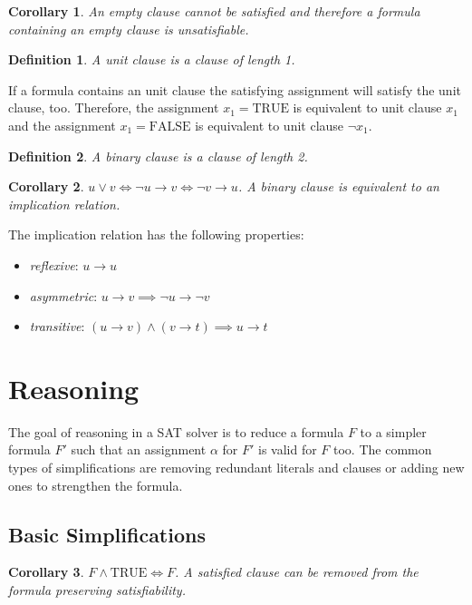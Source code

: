 \documentclass[12pt]{article}
\newtheorem{definition}{Definition}
\newtheorem{corollary}{Corollary}
\newcommand{\T}{\text{TRUE}}
\begin{document}
\begin{corollary}
An \emph{empty clause} cannot be satisfied and therefore a formula containing an empty clause
is unsatisfiable.
\end{corollary}

\begin{definition}
A \emph{unit clause} is a clause of length 1.
\end{definition}
If a formula contains an unit clause the satisfying
assignment will satisfy the unit clause, too. Therefore, the assignment $x_1 = \text{TRUE}$
is equivalent to unit clause $x_1$ and the assignment $x_1 = \text{FALSE}$ is equivalent to
unit clause $\neg x_1$.

\begin{definition}
A \emph{binary clause} is a clause of length 2.
\end{definition}

\begin{corollary}
$u \lor v \iff \neg u \rightarrow v \iff \neg v \rightarrow u$. A binary clause is
equivalent to an implication relation.
\end{corollary}

The implication relation has the following properties:
\begin{itemize}
\item \emph{reflexive}: $u \rightarrow u$
\item \emph{asymmetric}: $u \rightarrow v \implies \neg u \rightarrow \neg v$
\item \emph{transitive}: $(u \rightarrow v) \land (v \rightarrow t) \implies u \rightarrow t$
\end{itemize}


\section{Reasoning}

The goal of reasoning in a SAT solver is to reduce a formula $F$ to a simpler formula $F'$ such
that an assignment $\alpha$ for $F'$ is valid for $F$ too. The common types of simplifications
are removing redundant literals and clauses or adding new ones to strengthen the formula.


\subsection{Basic Simplifications}

\begin{corollary}
$F \land \T \iff F$. A satisfied clause can be removed from the formula preserving satisfiability.
\end{corollary}
\end{document}
